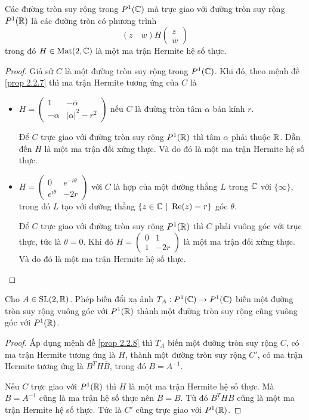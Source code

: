 \begin{prop}\label{prop 2.2.10}
    Các đường tròn suy rộng trong $P^1(\mathbb{C})$ mà trực giao với đường tròn suy rộng $P^1(\mathbb{R})$ là các đường tròn có phương trình
    \[(z\quad w)H\begin{pmatrix}
        \overline{z}\\ \overline{w}
    \end{pmatrix}\]
    trong đó $H \in \operatorname{Mat}(2,\mathbb{C})$ là một ma trận Hermite hệ số thực.
\end{prop}
\begin{proof}
    Giả sử $C$ là một đường tròn suy rộng trong $P^1(\mathbb{C})$. Khi đó, theo mệnh đề \ref{prop 2.2.7} thì ma trận Hermite tương ứng của $C$ là 
    \begin{itemize}
        \item $H = \begin{pmatrix}
            1 & -\overline{\alpha}\\
            -\alpha & |\alpha|^2-r^2
        \end{pmatrix}$ nếu $C$ là đường tròn tâm $\alpha$ bán kính $r$.

        Để $C$ trực giao với đường tròn suy rộng $P^1(\mathbb{R})$ thì tâm $\alpha$ phải thuộc $\mathbb{R}$. Dẫn đến $H$ là một ma trận đối xứng thực. Và do đó là một ma trận Hermite hệ số thực.
        \item $H = \begin{pmatrix}
            0 & e^{-i\theta}\\
            e^{i\theta} & -2r
        \end{pmatrix}$ với $C$ là hợp của một đường thẳng $L$ trong $\mathbb{C}$ với $\{\infty\}$, trong đó $L$ tạo với đường thẳng $\{z\in \mathbb{C}~|~\operatorname{Re}(z) = r\}$ góc $\theta$.

        Để $C$ trực giao với đường tròn suy rộng $P^1(\mathbb{R})$ thì $C$ phải vuông góc với trục thực, tức là $\theta = 0$. Khi đó $H = \begin{pmatrix}
            0 & 1\\
            1 & -2r
        \end{pmatrix}$ là một ma trận đối xứng thực. Và do đó là một ma trận Hermite hệ số thực.
    \end{itemize}
\end{proof}
\begin{cor}\label{prop 2.2.11}
    Cho $A\in \operatorname{SL}(2,\mathbb{R})$. Phép biến đổi xạ ảnh $T_A: P^1(\mathbb{C}) \to P^1(\mathbb{C})$ biến một đường tròn suy rộng vuông góc với $P^1(\mathbb{R})$ thành một đường tròn suy rộng cũng vuông góc với $P^1(\mathbb{R})$.
\end{cor}
\begin{proof}
    Áp dụng mệnh đề \ref{prop 2.2.8} thì $T_A$ biến một đường tròn suy rộng $C$, có ma trận Hermite tương ứng là $H$, thành một đường tròn suy rộng $C'$, có ma trận Hermite tương ứng là $B^TH\overline{B}$, trong đó $B = A^{-1}$.

    Nếu $C$ trực giao với $P^1(\mathbb{R})$ thì $H$ là một ma trận Hermite hệ số thực. Mà $B=A^{-1}$ cũng là ma trận hệ số thực nên $\overline{B} = B$. Từ đó $B^TH\overline{B}$ cũng là một ma trận Hermite hệ số thực. Tức là $C'$ cũng trực giao với $P^1(\mathbb{R})$.

\end{proof}

